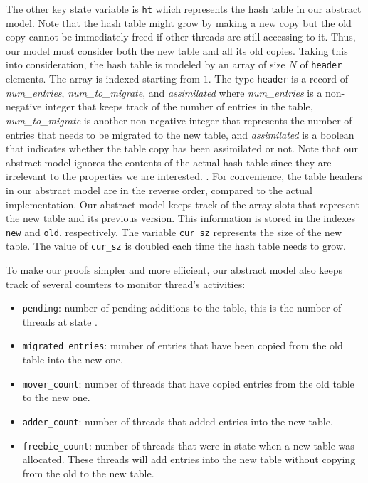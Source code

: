 The other key state variable is \texttt{ht} which represents the hash
table in our abstract model.  Note that the hash table might grow by
making a new copy but the old copy cannot be immediately freed if
other threads are still accessing to it. Thus, our model must consider
both the new table and all its old copies. Taking this into
consideration, the hash table is modeled by an array of size $N$ of
\texttt{header} elements. The array is indexed starting from $1$. The
type \texttt{header} is a record of \emph{num\_entries},
\emph{num\_to\_migrate}, and \emph{assimilated} where
\emph{num\_entries} is a non-negative integer that keeps track of the
number of entries in the table, \emph{num\_to\_migrate} is another
non-negative integer that represents the number of entries that needs
to be migrated to the new table, and \emph{assimilated} is a boolean
that indicates whether the table copy has been assimilated or
not. Note that our abstract model ignores the contents of the actual
hash table since they are irrelevant to the properties we are
interested. . For convenience, the
table headers in our abstract model are in the reverse order, compared
to the actual implementation.  Our abstract model keeps track of the
array slots that represent the new table and its previous
version. This information is stored in the indexes \texttt{new} and
\texttt{old}, respectively. The variable \texttt{cur\_sz} represents
the size of the new table. The value of \texttt{cur\_sz} is doubled
each time the hash table needs to grow.

To make our proofs simpler and more efficient, our abstract model also
keeps track of several counters to monitor thread's activities:

\begin{itemize}

\item \texttt{pending}: number of pending additions to the table, this
  is the number of threads at state \pcone.

\item \texttt{migrated\_entries}: number of entries that have been
  copied from the old table into the new one.

\item \texttt{mover\_count}: number of threads that have copied
  entries from the old table to the new one.

\item \texttt{adder\_count}: number of threads that added entries into
  the new table.
  
\item \texttt{freebie\_count}: number of threads that were in state
  \pcone when a new table was allocated. These threads will add
  entries into the new table without copying from the old to the new
  table.

\end{itemize}  

